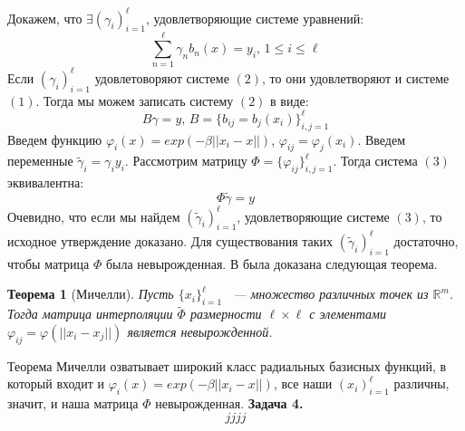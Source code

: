 \documentclass{article}
\newtheorem*{thm}{Теорема}
\begin{document}
Докажем, что $\exists (\gamma_i)_{i=1}^{\ell}$, удовлетворяющие  системе уравнений:
\begin{equation}
\sum_{n=1}^{\ell} \gamma_n b_n(x)=y_i, \, 1 \leqslant i \leqslant 
\ell
\end{equation}
Если $(\gamma_i)_{i=1}^{\ell}$ удовлетоворяют системе $(2)$, то они удовлетворяют и системе $(1)$.
Тогда мы можем записать систему $(2)$ в виде:
\begin{equation}
B \gamma = y, \, B=\{b_{ij}=b_j(x_i)\}_{i,j=1}^{\ell}
\end{equation}
Введем функцию $\varphi_i(x)=exp(-\beta || x_i -x||)$, $\varphi_{ij}=\varphi_j(x_i)$.
Введем переменные $\tilde \gamma_i = \gamma_i y_i$. 
Рассмотрим матрицу $\Phi=\{\varphi_{ij}\}_{i,j=1}^{\ell}$.
Тогда система $(3)$ эквивалентна:
\begin{equation}
\Phi \tilde \gamma = y
\end{equation}
Очевидно, что если мы найдем $(\tilde \gamma_i)_{i = 1}^{\ell}$, удовлетворяющие системе $(3)$, то исходное утверждение доказано.
Для существования таких $(\tilde \gamma_i)_{i = 1}^{\ell}$ достаточно, чтобы матрица $\Phi$ была невырожденная. 
В была доказана следующая теорема.
\begin{thm}[Мичелли]
Пусть $\{x_i\}_{i=1}^{\ell}$ ~--- множество различных точек из $\mathds{R}^m$. Тогда матрица интерполяции $\tilde \Phi$ размерности $\ell \times \ell$ с элементами $\varphi_{ij} = \varphi(||x_i-x_j||)$ является невырожденной.
\end{thm}
Теорема Мичелли озватывает широкий класс радиальных базисных функций, в который входит и 
$\varphi_i(x)=exp(-\beta || x_i -x||)$, все наши $(x_i)_{i = 1}^{\ell}$ различны, значит, и наша матрица $\Phi$ невырожденная. 
\newline
\textbf{Задача 4.}
\begin{equation*}
jjjj
\end{equation*}
\end{document}
